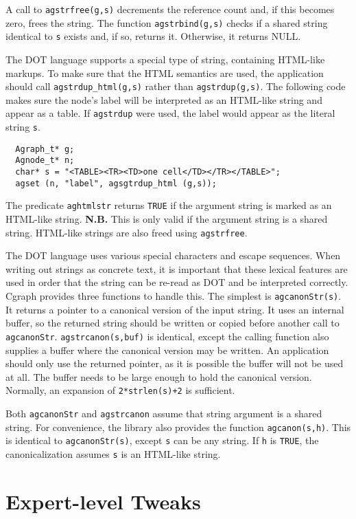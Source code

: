 \documentclass[11pt,letterpaper]{article}
\begin{document}
A call to \verb"agstrfree(g,s)" decrements the reference count and, if this becomes
zero, frees the string.
The function \verb"agstrbind(g,s)" checks if a shared string identical to \verb"s" exists
and, if so, returns it. Otherwise, it returns NULL.

The DOT language supports a special type of string, containing HTML-like markups. To make
sure that the HTML semantics are used, the application should call \verb"agstrdup_html(g,s)"
rather than \verb"agstrdup(g,s)". The following code makes sure the node's label will be
interpreted as an HTML-like string and appear as a table. If \verb"agstrdup" were used,
the label would appear as the literal string \verb"s".
\begin{verbatim}
  Agraph_t* g;
  Agnode_t* n;
  char* s = "<TABLE><TR><TD>one cell</TD></TR></TABLE>";
  agset (n, "label", agsgtrdup_html (g,s));
\end{verbatim}
The predicate \verb"aghtmlstr" returns \verb"TRUE" if the argument string is marked as an
HTML-like string. {\bf N.B.} This is only valid if the argument string is a shared string.
HTML-like strings are also freed using \verb"agstrfree".

The DOT language uses various special characters and escape sequences. When writing out
strings as concrete text, it is important that these lexical features are used in order
that the string can be re-read as DOT and be interpreted correctly.
Cgraph provides three functions to handle this. The simplest is \verb"agcanonStr(s)". 
It returns a pointer to a canonical version of the input string. It uses an internal 
buffer, so the returned string should be written or copied before another call to 
\verb"agcanonStr". \verb"agstrcanon(s,buf)" is identical, except the calling function
also supplies a buffer where the canonical version may be written. An application should only use
the returned pointer, as it is possible the buffer will not be used at all. The buffer
needs to be large enough to hold the canonical version. Normally, an expansion of 
\verb"2*strlen(s)+2" is sufficient.

Both \verb"agcanonStr" and \verb"agstrcanon" assume that string argument is a
shared string. For convenience, the library also provides the function \verb"agcanon(s,h)".
This is identical to \verb"agcanonStr(s)", except \verb"s" can be any string. If \verb"h"
is \verb"TRUE", the canonicalization assumes \verb"s" is an HTML-like string.

\section{Expert-level Tweaks}
\label{sec:expertleveltweaks}
\end{document}
